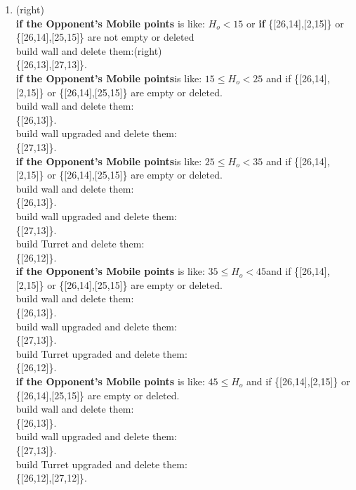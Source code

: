 \documentclass[12pt]{article}
\begin{document}
\begin{enumerate}
\begin{enumerate}
\item(right) \\\textbf{if the Opponent's Mobile points} is like: $ H_o < 15$ or \textbf{if}  \{[26,14],[2,15]\} or \{[26,14],[25,15]\} are not empty or deleted  \\build wall and delete them:(right)\\ \{[26,13],[27,13]\}. \\ \textbf{if the Opponent's Mobile points}is like: $15 \leq H_o < 25$ and if \{[26,14],[2,15]\} or \{[26,14],[25,15]\} are empty or deleted. \\ build wall and delete them:\\ \{[26,13]\}.\\  build wall upgraded and delete them:\\ \{[27,13]\}.\\ \textbf{if the Opponent's Mobile points}is like: $25 \leq H_o < 35$ and if \{[26,14],[2,15]\} or \{[26,14],[25,15]\} are empty or deleted. \\ build wall and delete them:\\ \{[26,13]\}.\\  build wall upgraded and delete them:\\ \{[27,13]\}.\\build Turret and delete them:\\ \{[26,12]\}.\\ \textbf{if the Opponent's Mobile points} is like: $35 \leq H_o < 45$and if \{[26,14],[2,15]\} or \{[26,14],[25,15]\} are empty or deleted. \\ build wall and delete them:\\ \{[26,13]\}.\\  build wall upgraded and delete them:\\ \{[27,13]\}.\\build Turret upgraded and delete them:\\ \{[26,12]\}. \\ \textbf{if the Opponent's Mobile points} is like: $45 \leq H_o $ and if \{[26,14],[2,15]\} or \{[26,14],[25,15]\} are empty or deleted. \\ build wall and delete them:\\ \{[26,13]\}.\\  build wall upgraded and delete them:\\ \{[27,13]\}.\\build Turret upgraded and delete them:\\ \{[26,12],[27,12]\}.
\end{enumerate}

\end{enumerate}
\end{document}
